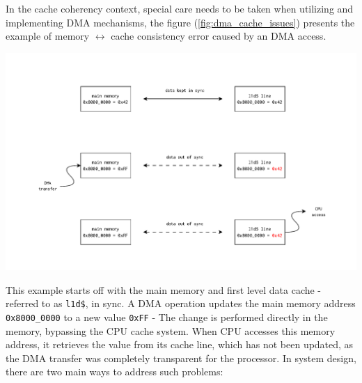 \noindent In the cache coherency context, special care needs to be %
taken when utilizing and implementing DMA mechanisms, the figure
(\ref{fig:dma_cache_issues}) presents the example of memory $\leftrightarrow$
cache consistency error caused by an DMA access.

\begin{center}
	\centering
	\includegraphics[width=\textwidth]{figures/02-background/dma_cache_issues.pdf}
	\label{fig:dma_cache_issues}
\end{center}

\noindent This example starts off with the main memory and first level data cache - referred to as \texttt{l1d\$}, in sync.
A DMA operation updates the main memory address \texttt{0x8000\_0000} to a new value \texttt{0xFF} - The change is performed directly
in the memory, bypassing the CPU cache system. When CPU accesses this memory address, it retrieves the value from its
cache line, which has not been updated, as the DMA transfer was completely transparent for the processor.
In system design, there are two main ways to address such problems:

